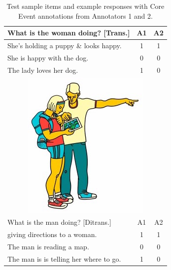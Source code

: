 \documentclass[11pt,a4paper]{article}
\begin{document}
\begin{table}[t!]
\begin{center}
\begin{tabular}{|l|c|c|}
\hline
What is the woman doing? [Trans.] & A1 & A2 \\
\hline
She's holding a puppy \& looks happy. & 1 & 1 \\
\hline
She is happy with the dog. & 0 & 0 \\
\hline
The lady loves her dog. & 1 & 0 \\
\hline
\hline
\multicolumn{3}{|c|}{\includegraphics[width=0.5\columnwidth]{figures/I28.jpg}} \\
\hline
What is the man doing? [Ditrans.] & A1 & A2 \\
\hline
giving directions to a woman. & 1 & 1 \\
\hline
The man is reading a map. & 0 & 0 \\
\hline
The man is is telling her where to go. & 1 & 0 \\
\hline
\end{tabular}
\caption{\label{tab:test-sample-items} Test sample items and example responses with Core Event annotations from Annotators 1 and 2.}
\end{center}
\end{table}
\end{document}
